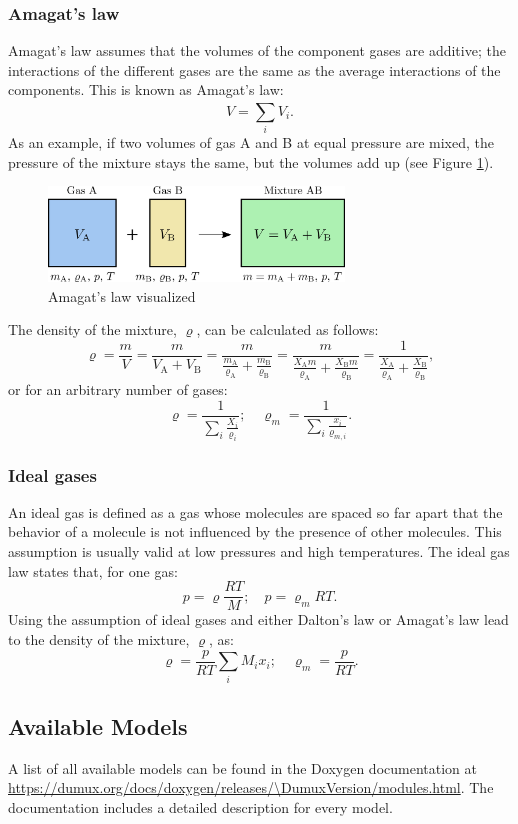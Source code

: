 \subsubsection{Amagat's law}
Amagat's law assumes that the volumes of the component gases are additive; the interactions of the different gases are the same as the average interactions of the components. This is known as Amagat's law:
%
\begin{equation}
V = \sum_{i}^{}V_i.
\end{equation}
%
As an example, if two volumes of gas A and B at equal pressure are mixed, the pressure of the mixture stays the same, but the volumes add up (see Figure \ref{fig:dalton2}).
%
\begin{figure}[ht]
  \centering
  \includegraphics[width=0.7\textwidth]{png/dalton2.png}
  \caption{Amagat's law visualized}
  \label{fig:dalton2}
\end{figure}
%
The density of the mixture, $\varrho$, can be calculated as follows:
\begin{equation}
\varrho = \frac{m}{V} = \frac{m}{V_\mathrm{A} + V_\mathrm{B}} = \frac{m}{\frac{m_\mathrm{A}}{\varrho_\mathrm{A}} + \frac{m_\mathrm{B}}{\varrho_\mathrm{B}}} =
\frac{m}{\frac{X_\mathrm{A} m}{\varrho_\mathrm{A}} + \frac{X_\mathrm{B} m}{\varrho_\mathrm{B}}} = \frac{1}{\frac{X_\mathrm{A}}{\varrho_\mathrm{A}} + \frac{X_\mathrm{B}}{\varrho_\mathrm{B}}},
\end{equation}
%
or for an arbitrary number of gases:
%
\begin{equation}
\varrho = \frac{1}{\sum_{i}^{}\frac{X_i}{\varrho_i}}  ; \quad  \varrho_m = \frac{1}{\sum_{i}^{}\frac{x_i}{\varrho_{m,i}}}.
\end{equation}
%
\subsubsection{Ideal gases}
An ideal gas is defined as a gas whose molecules are spaced so far apart that the behavior of a molecule is not influenced by the presence of other molecules.
This assumption is usually valid at low pressures and high temperatures. The ideal gas law states that, for one gas:
%
\begin{equation}
p = \varrho \frac{RT}{M} ; \quad p= \varrho_m RT.
\end{equation}
%
Using the assumption of ideal gases and either Dalton's law or Amagat's law lead to the density of the mixture, $\varrho$, as:
%
\begin{equation}
\varrho = \frac{p}{RT} \sum_{i}^{}M_i x_i ; \quad \varrho_m = \frac{p}{RT}.
\end{equation}
%
\subsection{Available Models}
A list of all available models can be found
in the Doxygen documentation at
\url{https://dumux.org/docs/doxygen/releases/\DumuxVersion/modules.html}.
The documentation includes a detailed description for every model.
